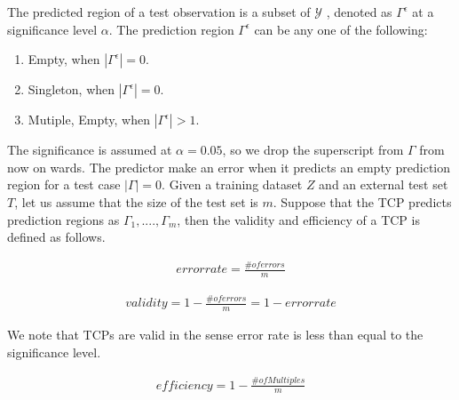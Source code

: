\documentclass[main]{subfiles}
\begin{document}
The predicted region of a test observation is a subset of $\mathcal{Y}$ , denoted as $\Gamma^{\epsilon}$ at a significance level $\alpha$. The prediction region $\Gamma^{\epsilon}$ can be any one of the following:
\begin{enumerate}
\item Empty, when $|\Gamma^{\epsilon}| = 0$.
\item Singleton, when $|\Gamma^{\epsilon}| = 0$.
\item Mutiple, Empty, when $|\Gamma^{\epsilon}| >1$.
\end{enumerate}
The significance is assumed at $\alpha = 0.05$, so we drop the superscript from $\Gamma$ from now on wards. The predictor make an error when it predicts an empty prediction region for a test case $|\Gamma| = 0$. Given a training dataset $Z$ and an external test set $T$,  let us assume that the size of the test set is $m$. Suppose that the TCP predicts prediction regions as $\Gamma_1, ...., \Gamma_m$, then the validity and efficiency of a TCP is defined as follows.

\begin{definition}
\begin{align} \label{eq:errorRate}
		error rate = \frac{\# of errors}{m}
\end{align}	 	
\end{definition}
 
\begin{definition}[Validity]
\begin{align} \label{eq:validity}
		validity = 1-  \frac{\# of errors}{m} = 1-  error rate 
\end{align}	 
\end{definition}
We note that TCPs are valid in the sense error rate is less than equal to the significance level.

\begin{definition}[Efficiency]
\begin{align} \label{eq:efficiency}
	efficiency = 1-  \frac{\# of Multiples}{m}
\end{align}
\end{definition}
\end{document}
